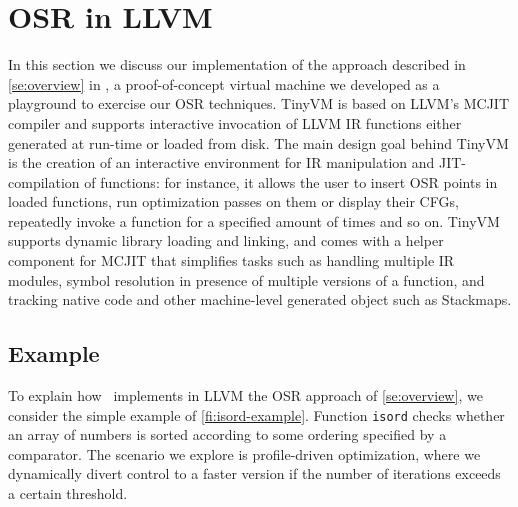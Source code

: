 
\section{OSR in LLVM}
\label{se:osr-llvm}

In this section we discuss our implementation of the approach described in \mysection\ref{se:overview} in \tinyvm, a proof-of-concept virtual machine we developed as a playground to exercise our OSR techniques. TinyVM is based on LLVM's MCJIT compiler and supports interactive invocation of LLVM IR functions either generated at run-time or loaded from disk. The main design goal behind TinyVM is the creation of an interactive environment for IR manipulation and JIT-compilation of functions: for instance, it allows the user to insert OSR points in loaded functions, run optimization passes on them or display their CFGs, repeatedly invoke a function for a specified amount of times and so on. TinyVM supports dynamic library loading and linking, and comes with a helper component for MCJIT that simplifies tasks such as handling multiple IR modules, symbol resolution in presence of multiple versions of a function, and tracking native code and other machine-level generated object such as Stackmaps.

\subsection{Example}
To explain how \tinyvm\ implements in LLVM the OSR approach of \mysection\ref{se:overview}, we consider the simple example of \myfigure\ref{fi:isord-example}. Function {\tt isord} checks whether an array of numbers is sorted according to some ordering specified by a comparator. The scenario we explore is profile-driven optimization, where we dynamically divert control to a faster version if the number of iterations exceeds a certain threshold. 

